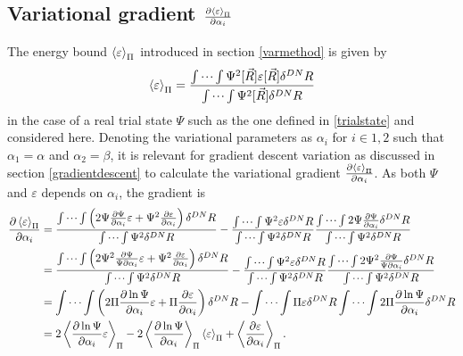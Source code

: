 \documentclass[a4paper,8pt]{article}
\begin{document}
\subsection{Variational gradient $\frac{\partial\ev{\varepsilon}_\Pi}{\partial\alpha_i}$} \label{vargrad}
The energy bound $\ev{\varepsilon}_\Pi$ introduced in section \ref{varmethod} is given by
\begin{equation}
\ev{\varepsilon}_\Pi = \frac{\idotsint \Psi^2[\vec{R}] \varepsilon[\vec{R}] \delta^{DN}R}{\idotsint \Psi^2[\vec{R}]\delta^{DN}R} \label{energybound}
\end{equation}
in the case of a real trial state $\Psi$ such as the one defined in \eqref{trialstate} and considered here. Denoting the variational parameters as $\alpha_i$ for $i \in {1,2}$ such that $\alpha_1 = \alpha$ and $\alpha_2 = \beta$, it is relevant for gradient descent variation as discussed in section \ref{gradientdescent} to calculate the variational gradient $\frac{\partial \ev{\varepsilon}_\Pi}{\partial \alpha_i}$. As both $\Psi$ and $\varepsilon$ depends on $\alpha_i$, the gradient is
\begin{align}
\frac{\partial\ev{\varepsilon}_\Pi}{\partial\alpha_i} &= \frac{\idotsint \left(2\Psi\frac{\partial\Psi}{\partial\alpha_i}\varepsilon+\Psi^2\frac{\partial\varepsilon}{\partial\alpha_i}\right)\delta^{DN}R}{\idotsint \Psi^2 \delta^{DN}R} - \frac{\idotsint \Psi^2\varepsilon \delta^{DN}R}{\idotsint \Psi^2 \delta^{DN}R}\frac{\idotsint 2\Psi\frac{\partial\Psi}{\partial\alpha_i}\delta^{DN}R}{\idotsint \Psi^2 \delta^{DN}R} \nonumber\\
&= \frac{\idotsint \left(2\Psi^2\frac{\partial\Psi}{\Psi\partial\alpha_i}\varepsilon+\Psi^2\frac{\partial\varepsilon}{\partial\alpha_i}\right)\delta^{DN}R}{\idotsint \Psi^2 \delta^{DN}R} - \frac{\idotsint \Psi^2\varepsilon \delta^{DN}R}{\idotsint \Psi^2 \delta^{DN}R}\frac{\idotsint 2\Psi^2\frac{\partial\Psi}{\Psi\partial\alpha_i}\delta^{DN}R}{\idotsint \Psi^2 \delta^{DN}R} \nonumber\\
&= \idotsint \left(2\Pi\frac{\partial\ln\Psi}{\partial\alpha_i}\varepsilon+\Pi\frac{\partial\varepsilon}{\partial\alpha_i}\right)\delta^{DN}R - \idotsint \Pi\varepsilon \delta^{DN}R \idotsint 2\Pi\frac{\partial\ln\Psi}{\partial\alpha_i} \delta^{DN}R \nonumber\\
&= 2\ev{\frac{\partial\ln\Psi}{\partial\alpha_i}\varepsilon}_\Pi-2\ev{\frac{\partial\ln\Psi}{\partial\alpha_i}}_\Pi\ev{\varepsilon}_\Pi+\ev{\frac{\partial\varepsilon}{\partial\alpha_i}}_\Pi. \nonumber
\end{align}
\end{document}
